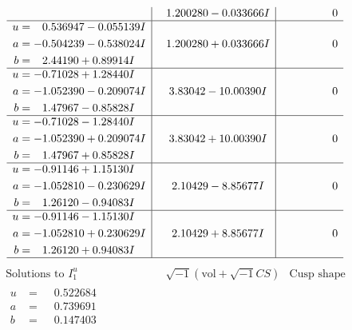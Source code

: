 \documentclass[1p]{elsarticle_modified}
\theoremstyle{definition}
\newcommand{\I}{\sqrt{-1}}
\begin{document}
$$\begin{array}{c|c|c}
 & \phantom{-}1.200280 - 0.033666 I & \phantom{-0.000000 } 0 \\ \hline\begin{aligned}
u &= \phantom{-}0.536947 - 0.055139 I \\
a &= -0.504239 - 0.538024 I \\
b &= \phantom{-}2.44190 + 0.89914 I\end{aligned}
 & \phantom{-}1.200280 + 0.033666 I & \phantom{-0.000000 } 0 \\ \hline\begin{aligned}
u &= -0.71028 + 1.28440 I \\
a &= -1.052390 - 0.209074 I \\
b &= \phantom{-}1.47967 - 0.85828 I\end{aligned}
 & \phantom{-}3.83042 - 10.00390 I & \phantom{-0.000000 } 0 \\ \hline\begin{aligned}
u &= -0.71028 - 1.28440 I \\
a &= -1.052390 + 0.209074 I \\
b &= \phantom{-}1.47967 + 0.85828 I\end{aligned}
 & \phantom{-}3.83042 + 10.00390 I & \phantom{-0.000000 } 0 \\ \hline\begin{aligned}
u &= -0.91146 + 1.15130 I \\
a &= -1.052810 - 0.230629 I \\
b &= \phantom{-}1.26120 - 0.94083 I\end{aligned}
 & \phantom{-}2.10429 - 8.85677 I & \phantom{-0.000000 } 0 \\ \hline\begin{aligned}
u &= -0.91146 - 1.15130 I \\
a &= -1.052810 + 0.230629 I \\
b &= \phantom{-}1.26120 + 0.94083 I\end{aligned}
 & \phantom{-}2.10429 + 8.85677 I & \phantom{-0.000000 } 0\\
 \hline 
 \end{array}$$\newpage$$\begin{array}{c|c|c}  
\text{Solutions to }I^u_{1}& \I (\text{vol} + \sqrt{-1}CS) & \text{Cusp shape}\\
 \hline 
\begin{aligned}
u &= \phantom{-}0.522684\phantom{ +0.000000I} \\
a &= \phantom{-}0.739691\phantom{ +0.000000I} \\
b &= \phantom{-}0.147403\phantom{ +0.000000I}\end{aligned}

\end{array}$$
\end{document}
